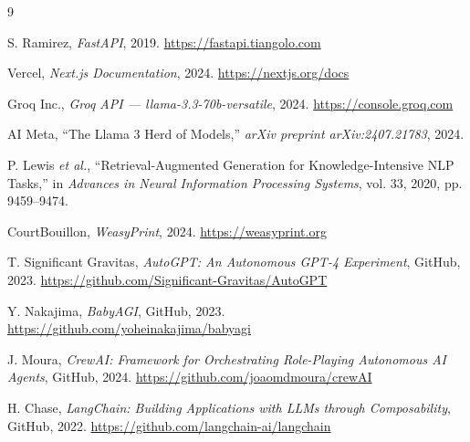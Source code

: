 \documentclass[10pt, twocolumn]{article}
\begin{document}
\begin{thebibliography}{9}

S. Ramirez, \textit{FastAPI}, 2019. \url{https://fastapi.tiangolo.com}

Vercel, \textit{Next.js Documentation}, 2024. \url{https://nextjs.org/docs}

Groq Inc., \textit{Groq API — llama-3.3-70b-versatile}, 2024.
\url{https://console.groq.com}

AI Meta, ``The Llama 3 Herd of Models,'' \textit{arXiv preprint
arXiv:2407.21783}, 2024.

P. Lewis \textit{et al.}, ``Retrieval-Augmented Generation for
Knowledge-Intensive NLP Tasks,'' in \textit{Advances in Neural Information
Processing Systems}, vol. 33, 2020, pp. 9459--9474.

CourtBouillon, \textit{WeasyPrint}, 2024. \url{https://weasyprint.org}

T. Significant Gravitas, \textit{AutoGPT: An Autonomous GPT-4 Experiment},
GitHub, 2023. \url{https://github.com/Significant-Gravitas/AutoGPT}

Y. Nakajima, \textit{BabyAGI}, GitHub, 2023.
\url{https://github.com/yoheinakajima/babyagi}

J. Moura, \textit{CrewAI: Framework for Orchestrating Role-Playing
Autonomous AI Agents}, GitHub, 2024. \url{https://github.com/joaomdmoura/crewAI}

H. Chase, \textit{LangChain: Building Applications with LLMs through
Composability}, GitHub, 2022. \url{https://github.com/langchain-ai/langchain}

\end{thebibliography}
\end{document}
